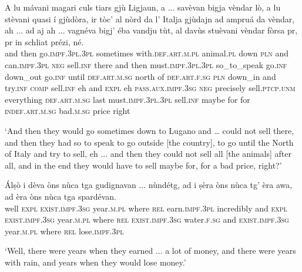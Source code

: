 \begin{linenumbers}
\gll A lu mávani magari culs tiars gjù Ligjaun, a ... savèvan bigja vèndar lò, a lu stèvani quasi í gjùdòra, ir tòc’ al nòrd da l’ Italja gjùdajn ad ampruá da vèndar, ah ... ad aj ah ... vagnéva bigj’ éba vandju tùt, al davùs stuèvani vèndar fòrsa pr, pr in schliat prézi, né.\\
and then go.\textsc{impf.3pl.3pl} sometimes with.\textsc{def.art.m.pl} animal.\textsc{pl} down \textsc{pln} and {} can.\textsc{impf.3pl} \textsc{neg} sell.\textsc{inf} there and then must.\textsc{impf.3pl.3pl} so\_to\_speak go.\textsc{inf} down\_out go.\textsc{inf} until \textsc{def.art.m.sg} north of \textsc{def.art.f.sg} \textsc{pln} down\_in and try.\textsc{inf} \textsc{comp} sell.\textsc{inf} eh {} and \textsc{expl} eh {} \textsc{pass.aux.impf.3sg} \textsc{neg} precisely sell.\textsc{ptcp.unm} everything \textsc{def.art.m.sg} last must.\textsc{impf.3pl.3pl} sell.\textsc{inf} maybe for for \textsc{indef.art.m.sg} bad.\textsc{m.sg} price right \\
\end{linenumbers}
\medskip
\glt `And then they would go sometimes down to Lugano and … could not sell there, and then they had so to speak to go outside [the country], to go until the North of Italy and try to sell, eh ... and then they could not sell all [the animals] after all, and in the end they would have to sell maybe for, for a bad price, right?'
\medskip

\begin{linenumbers}
\gll Álṣò i dèva òns nùca tga gudignavan ... nùndétg, ad i ṣèra òns nùca tg’ èra awa, ad èra òns nùca tga spardévan.\\
well \textsc{expl} \textsc{exist.impf.3sg} year.\textsc{m.pl} where \textsc{rel} earn.\textsc{impf.3pl} {} incredibly and \textsc{expl} \textsc{exist.impf.3sg} year.\textsc{m.pl} where \textsc{rel} \textsc{exist.impf.3sg} water.\textsc{f.sg} and \textsc{exist.impf.3sg} year.\textsc{m.pl} where \textsc{rel} lose.\textsc{impf.3pl} \\
\end{linenumbers}
\medskip
\glt `Well, there were years when they earned ... a lot of money, and there were years with rain, and years when they would lose money.'
\medskip


